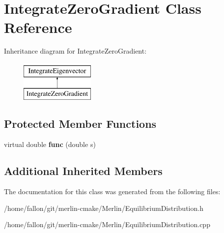 \hypertarget{classIntegrateZeroGradient}{}\section{Integrate\+Zero\+Gradient Class Reference}
\label{classIntegrateZeroGradient}
Inheritance diagram for Integrate\+Zero\+Gradient\+:\begin{figure}[H]
\begin{center}
\leavevmode
\includegraphics[height=2.000000cm]{classIntegrateZeroGradient}
\end{center}
\end{figure}
\subsection*{Protected Member Functions}
\begin{DoxyCompactItemize}
\item 
\mbox{\label{classIntegrateZeroGradient_a9e57fdac82023930870b916e1d534f7c}} 
virtual double {\bfseries func} (double s)
\end{DoxyCompactItemize}
\subsection*{Additional Inherited Members}


The documentation for this class was generated from the following files\+:\begin{DoxyCompactItemize}
\item 
/home/fallon/git/merlin-\/cmake/\+Merlin/Equilibrium\+Distribution.\+h\item 
/home/fallon/git/merlin-\/cmake/\+Merlin/Equilibrium\+Distribution.\+cpp\end{DoxyCompactItemize}
